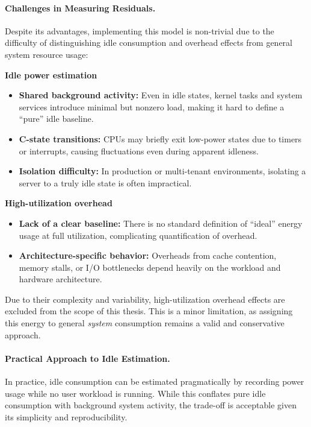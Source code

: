 \paragraph{Challenges in Measuring Residuals.} 
Despite its advantages, implementing this model is non-trivial due to the difficulty of distinguishing idle consumption and overhead effects from general system resource usage:

\textbf{Idle power estimation}
\begin{itemize}
    \item \textbf{Shared background activity:} Even in idle states, kernel tasks and system services introduce minimal but nonzero load, making it hard to define a “pure” idle baseline.
    \item \textbf{C-state transitions:} CPUs may briefly exit low-power states due to timers or interrupts, causing fluctuations even during apparent idleness.
    \item \textbf{Isolation difficulty:} In production or multi-tenant environments, isolating a server to a truly idle state is often impractical.
\end{itemize}

\textbf{High-utilization overhead}
\begin{itemize}
    \item \textbf{Lack of a clear baseline:} There is no standard definition of “ideal” energy usage at full utilization, complicating quantification of overhead.
    \item \textbf{Architecture-specific behavior:} Overheads from cache contention, memory stalls, or I/O bottlenecks depend heavily on the workload and hardware architecture.
\end{itemize}

Due to their complexity and variability, high-utilization overhead effects are excluded from the scope of this thesis. This is a minor limitation, as assigning this energy to general \textit{system} consumption remains a valid and conservative approach.

\paragraph{Practical Approach to Idle Estimation.} 
In practice, idle consumption can be estimated pragmatically by recording power usage while no user workload is running. While this conflates pure idle consumption with background system activity, the trade-off is acceptable given its simplicity and reproducibility.

